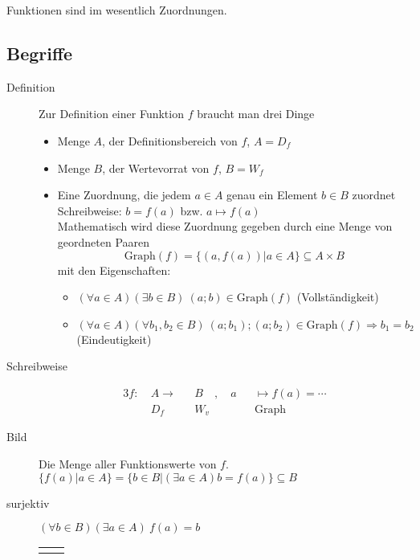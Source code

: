Funktionen sind im wesentlich Zuordnungen.
\subsection{Begriffe}
\begin{description}
    \item[Definition] Zur Definition einer Funktion $f$ braucht man drei Dinge
    \begin{itemize}
        \item Menge $A$, der Definitionsbereich von $f$, $A = D_f$
        \item Menge $B$, der Wertevorrat von $f$, $B = W_f$
        \item Eine Zuordnung, die jedem $a \in A$ genau ein Element $b \in B$ zuordnet \\
        Schreibweise: $b = f(a)$ bzw. $a \longmapsto f(a)$ \\
        Mathematisch wird diese Zuordnung gegeben durch eine Menge von geordneten Paaren
        $$\textrm{Graph}(f) = \lbrace(a,f(a)) | a \in A \rbrace \subseteq A \times B$$
        mit den Eigenschaften:
        \begin{itemize}
            \item $(\forall a \in A)(\exists b \in B)\ (a;b) \in \textrm{Graph}(f)$ (Vollständigkeit)
            \item $(\forall a \in A)(\forall b_1,b_2 \in B)\ (a;b_1);(a;b_2) \in \textrm{Graph}(f)\Rightarrow b_1 = b_2$ (Eindeutigkeit)
        \end{itemize}
    \end{itemize}
    \item[Schreibweise]
    \begin{alignat*}{3}
        f :\  & A \longrightarrow &  & B \quad , \quad a &  & \longmapsto f(a) = \cdots \\
        & D_f               &  & W_v               &  & \textrm{Graph}
    \end{alignat*}
    \item[Bild] Die Menge aller Funktionswerte von $f$. $\lbrace f(a) | a \in A \rbrace = \lbrace b \in B  | (\exists a \in A) b = f(a) \rbrace \subseteq B$
    \item[surjektiv] $(\forall b \in B)(\exists a \in A) \ f(a) = b$ \\
    \begin{tabularx}{\linewidth}{l|X}
        \adjustbox{valign = t}{
            \begin{tikzpicture}[thick, set/.style = {ellipse, minimum width = 2cm, minimum height = 4cm, draw = black, align = center}, element/.style = {circle, draw = black, minimum size = 0.7, outer sep = 0.05cm}]

\end{tikzpicture}}
\end{tabularx}
\end{description}
